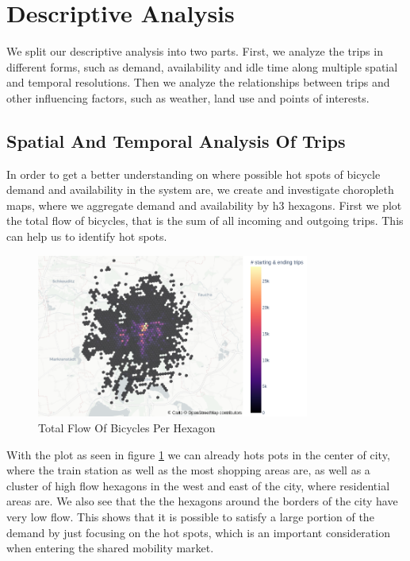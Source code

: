 \section{Descriptive Analysis}
\label{sec:descriptive_analysis}

We split our descriptive analysis into two parts.
First, we analyze the trips in different forms, such as demand, availability and
idle time along multiple spatial and temporal resolutions. Then we analyze the
relationships between trips and other influencing factors, such as weather,
land use and points of interests.


\subsection{Spatial And Temporal Analysis Of Trips}
\label{subsec:descriptive_analysis_spatial_temporal}

In order to get a better understanding on where possible hot spots of bicycle
demand and availability in the system are, we create and investigate choropleth maps,
where we aggregate demand and availability by h3 hexagons.
First we plot the total flow of bicycles, that is the sum of all incoming and
outgoing trips. This can help us to identify hot spots.

\begin{figure}[htb]
    \centering
    \includegraphics[width=0.8\textwidth]{figures/descriptive_analysis/total_flow.png}
    \caption{Total Flow Of Bicycles Per Hexagon}
    \label{fig:descriptive_analysis_total_flow}
\end{figure}

With the plot as seen in figure \ref{fig:descriptive_analysis_total_flow} we
can already hots pots in the center of city, where the train station as well as
the most shopping areas are, as well as a cluster of high flow hexagons in the
west and east of the city, where residential areas are.
We also see that the the hexagons around the borders of the city have very low flow.
This shows that it is possible to satisfy a large portion of the demand by just focusing on the hot spots, which is an important consideration when entering the shared mobility market.

